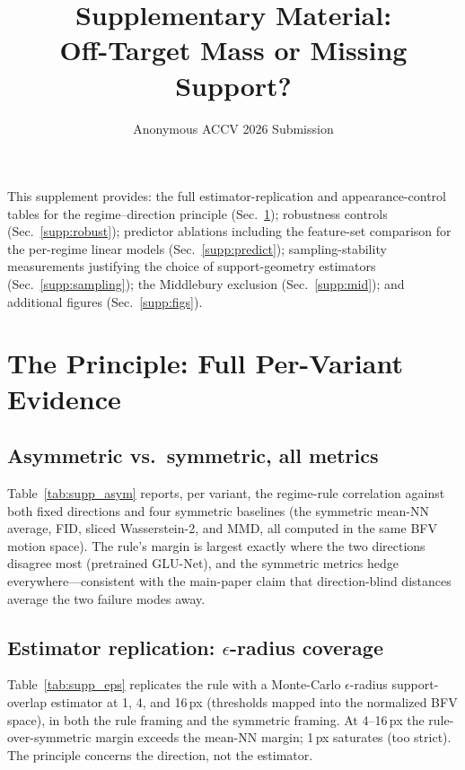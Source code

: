 \documentclass[runningheads]{llncs}
\begin{document}
\title{Supplementary Material:\\Off-Target Mass or Missing Support?}
\author{Anonymous ACCV 2026 Submission}
\maketitle

\noindent This supplement provides: the full estimator-replication and
appearance-control tables for the regime--direction principle
(Sec.~\ref{supp:law}); robustness controls (Sec.~\ref{supp:robust});
predictor ablations including the feature-set comparison for the per-regime
linear models (Sec.~\ref{supp:predict}); sampling-stability measurements
justifying the choice of support-geometry estimators
(Sec.~\ref{supp:sampling}); the Middlebury exclusion (Sec.~\ref{supp:mid});
and additional figures (Sec.~\ref{supp:figs}).

\section{The Principle: Full Per-Variant Evidence}
\label{supp:law}

\subsection{Asymmetric vs.\ symmetric, all metrics}
Table~\ref{tab:supp_asym} reports, per variant, the regime-rule correlation
against both fixed directions and four symmetric baselines (the symmetric
mean-NN average, FID, sliced Wasserstein-2, and MMD, all computed in the same
BFV motion space). The rule's margin is largest exactly where the two
directions disagree most (pretrained GLU-Net), and the symmetric metrics
hedge everywhere---consistent with the main-paper claim that direction-blind
distances average the two failure modes away.

\begin{table}[h]
\centering
\caption{Per-variant ranking correlations: the regime rule vs.\ fixed
directions and symmetric baselines. Variants grouped scratch-first.}
\label{tab:supp_asym}
\scriptsize
\setlength{\tabcolsep}{3pt}

\end{table}

\subsection{Estimator replication: $\epsilon$-radius coverage}
Table~\ref{tab:supp_eps} replicates the rule with a Monte-Carlo
$\epsilon$-radius support-overlap estimator at 1, 4, and 16\,px (thresholds
mapped into the normalized BFV space), in both the rule framing and the
symmetric framing. At 4--16\,px the rule-over-symmetric margin exceeds the
mean-NN margin; 1\,px saturates (too strict). The principle concerns the
direction, not the estimator.
\end{document}
